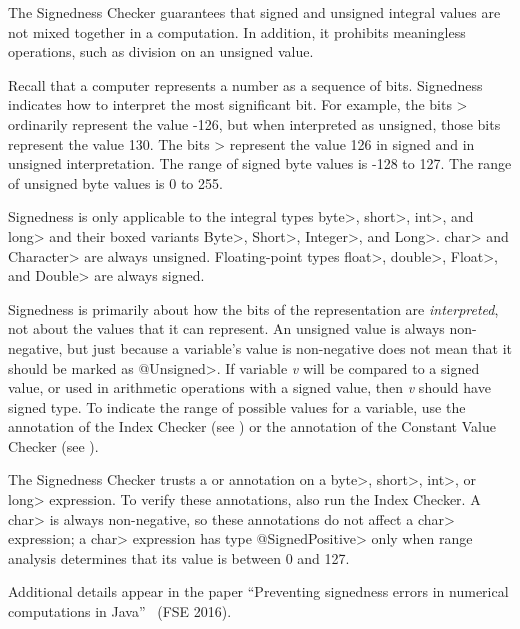 
The Signedness Checker guarantees that signed and unsigned integral values are not mixed
together in a computation. In addition, it prohibits meaningless operations, such
as division on an unsigned value.

Recall that a computer represents a number as a sequence of bits.
Signedness indicates how to interpret the most significant bit.  For
example, the bits > ordinarily represent the value -126, but when
interpreted as unsigned, those bits represent the value 130.  The bits
> represent the value 126 in signed and in unsigned interpretation.
The range of signed byte values is -128 to 127.  The range of unsigned byte
values is 0 to 255.

Signedness is only applicable to the integral types \<byte>,
\<short>, \<int>, and \<long> and their boxed variants \<Byte>,
\<Short>, \<Integer>, and \<Long>.
\<char> and \<Character> are always unsigned.
Floating-point types \<float>, \<double>, \<Float>, and \<Double> are always signed.

Signedness is primarily about how the bits of the representation are
\emph{interpreted}, not about the values that it can represent.  An unsigned value
is always non-negative, but just because a variable's value is non-negative does
not mean that it should be marked as \<@Unsigned>.  If variable \textit{v} will be
compared to a signed value, or used in arithmetic operations with a signed
value, then \textit{v} should have signed type.
To indicate the range of possible values for a variable, use the
 annotation of the Index
Checker (see ) or the
 annotation of the Constant Value
Checker (see ).

The Signedness Checker trusts a 
or  annotation on a \<byte>,
\<short>, \<int>, or \<long> expression.  To verify these annotations, also
run the Index Checker.  A \<char> is always non-negative, so these
annotations do not affect a \<char> expression; a \<char> expression has
type \<@SignedPositive> only when range analysis determines that its value is
between 0 and 127.

Additional details appear in the paper
``Preventing signedness errors in numerical computations in
Java''~\cite{Mackie2016} (FSE 2016).

